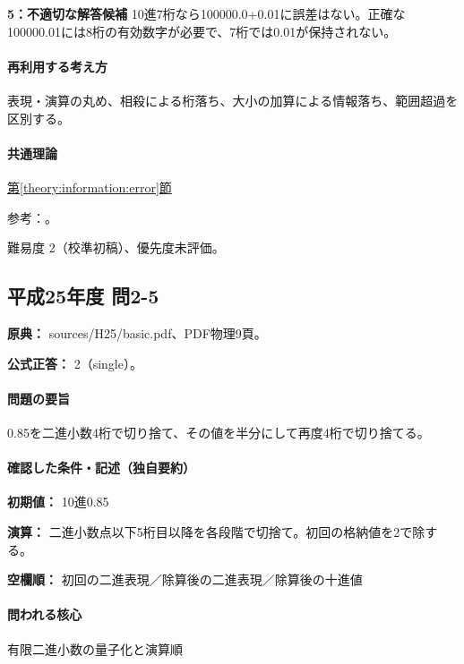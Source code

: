 \noindent\textbf{5：不適切な解答候補} 10進7桁なら100000.0+0.01に誤差はない。正確な100000.01には8桁の有効数字が必要で、7桁では0.01が保持されない。\par

\paragraph{再利用する考え方} 表現・演算の丸め、相殺による桁落ち、大小の加算による情報落ち、範囲超過を区別する。

\paragraph{共通理論} \hyperref[theory:information:error]{第\ref*{theory:information:error}節}

\par 参考：\cite{goldberg1991}。

\par 難易度 2（校準初稿）、優先度未評価。

\subsection{平成25年度 問2-5}
\label{q:h25-reg-basic-2-5}

\noindent\textbf{原典：} sources/H25/basic.pdf、PDF物理9頁。

\textbf{公式正答：} 2（single）。

\paragraph{問題の要旨} 0.85を二進小数4桁で切り捨て、その値を半分にして再度4桁で切り捨てる。

\paragraph{確認した条件・記述（独自要約）}\mbox{}\par

\noindent\textbf{初期値：} 10進0.85\par

\noindent\textbf{演算：} 二進小数点以下5桁目以降を各段階で切捨て。初回の格納値を2で除する。\par

\noindent\textbf{空欄順：} 初回の二進表現／除算後の二進表現／除算後の十進値\par

\paragraph{問われる核心} 有限二進小数の量子化と演算順


